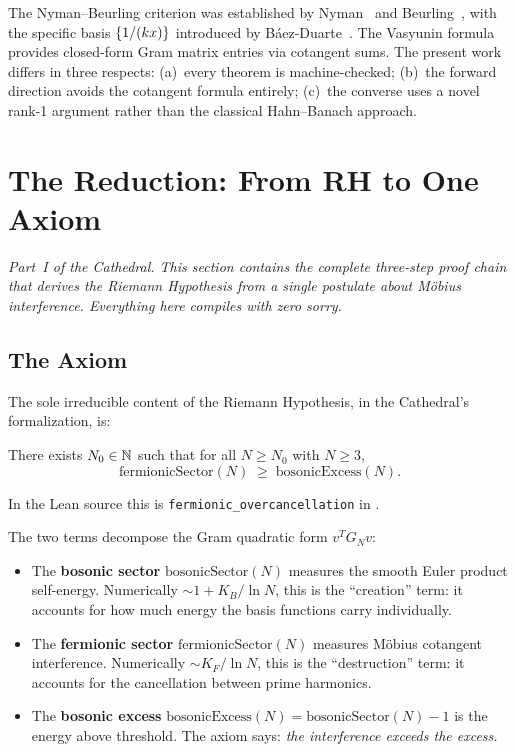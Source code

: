 \documentclass[11pt,a4paper]{article}
\begin{document}
The Nyman--Beurling criterion was established by
Nyman~\cite{nyman1950} and Beurling~\cite{beurling1955}, with the
specific basis $\{1/(kx)\}$ introduced by
B\'aez-Duarte~\cite{baezduarte2003}. The Vasyunin
formula~\cite{vasyunin1995} provides closed-form Gram matrix entries
via cotangent sums. The present work differs in three respects:
(a)~every theorem is machine-checked; (b)~the forward direction
avoids the cotangent formula entirely; (c)~the converse uses a
novel rank-1 argument rather than the classical Hahn--Banach approach.

\section{The Reduction: From RH to One Axiom}
\label{sec:reduction}

\noindent
\emph{Part~I of the Cathedral. This section contains the complete
three-step proof chain that derives the Riemann Hypothesis from a
single postulate about M\"obius interference. Everything here compiles
with zero sorry.}

\subsection{The Axiom}

The sole irreducible content of the Riemann Hypothesis, in the
Cathedral's formalization, is:

\begin{axiombox}
\label{ax:fermionic}
There exists $N_0 \in \mathbb{N}$ such that for all $N \geq N_0$ with
$N \geq 3$,
\[
  \mathrm{fermionicSector}(N) \;\geq\; \mathrm{bosonicExcess}(N).
\]
\end{axiombox}

\noindent
In the Lean source this is {\tt fermionic\_overcancellation} in
.

The two terms decompose the Gram quadratic form $v^T G_N v$:
\begin{itemize}
  \item The \textbf{bosonic sector}
    $\mathrm{bosonicSector}(N)$ measures the smooth Euler product
    self-energy. Numerically $\sim 1 + K_B/\ln N$, this is the
    ``creation'' term: it accounts for how much energy the basis
    functions carry individually.
  \item The \textbf{fermionic sector}
    $\mathrm{fermionicSector}(N)$ measures M\"obius cotangent
    interference. Numerically $\sim K_F/\ln N$, this is the
    ``destruction'' term: it accounts for the cancellation between
    prime harmonics.
  \item The \textbf{bosonic excess}
    $\mathrm{bosonicExcess}(N) = \mathrm{bosonicSector}(N) - 1$
    is the energy above threshold. The axiom says: \emph{the
    interference exceeds the excess.}
\end{itemize}
\end{document}
